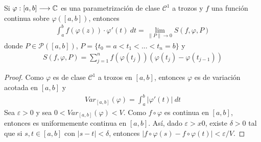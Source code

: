 \begin{lema}
    Si $\varphi : [a,b] \longrightarrow \mathbb{C}$ es una parametrización de clase $\mathcal{C}^1$ a trozos y $f$ una función continua sobre $\varphi([a,b])$, entonces
    \begin{align*}
        \int_{a}^{b}{f(\varphi(z))\cdot \varphi'(t) \ dt} = \lim_{\|P\| \to 0}{S(f,\varphi,P)}
    \end{align*}
    donde $P \in \mathcal{P}([a,b])$, $P = \{t_0 = a < t_1 < ... < t_n = b\}$ y
    \begin{align*}
        S(f,\varphi,P) = \sum_{j=1}^{n}f(\varphi(t_j))(\varphi(t_j) - \varphi(t_{j-1}))
    \end{align*}
\end{lema}

\begin{proof}
    Como $\varphi$ es de clase $\mathcal{C}^1$ a trozos en $[a,b]$, entonces $\varphi$ es de variación acotada en $[a,b]$ y
    \begin{align*}
        Var_{[a,b]}(\varphi) = \int_{a}^{b}{\left|\varphi'(t)\right| \ dt}
    \end{align*}
    Sea $\varepsilon > 0$ y sea $0 < Var_{[a,b]}(\varphi) < V$. Como $f \circ \varphi$ es continua en $[a,b]$, entonces es uniformemente continua en $[a,b]$. Así, dado $\varepsilon >x 0$, existe $\delta > 0$ tal que si $s,t \in [a,b]$ con $|s-t| < \delta$, entonces $|f \circ \varphi(s) - f \circ \varphi(t)| < \varepsilon/V$.


\end{proof}
